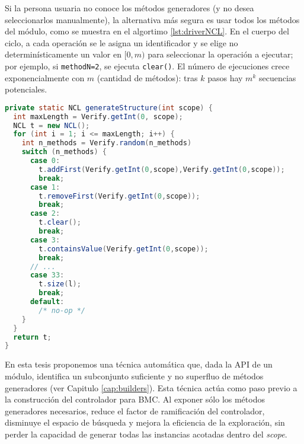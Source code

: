 Si la persona usuaria no conoce los métodos generadores (y no desea seleccionarlos manualmente), la alternativa más segura es
usar todos los métodos del módulo, como se muestra en el algortimo \ref{lst:driverNCL}. En el
cuerpo del ciclo, a cada operación se le asigna un identificador y se elige no determinísticamente un valor en \([0, m)\) para
seleccionar la operación a ejecutar; por ejemplo, si
\texttt{methodN=2}, se ejecuta \texttt{clear()}. El número de ejecuciones crece exponencialmente con \(m\) (cantidad de
métodos): tras \(k\) pasos hay \(m^{k}\) secuencias potenciales.
\\
\begin{lstlisting}[language=Java,caption={Controlador con todos los métodos},label={lst:driverNCL},captionpos=b] 
private static NCL generateStructure(int scope) {
  int maxLength = Verify.getInt(0, scope);
  NCL t = new NCL();
  for (int i = 1; i <= maxLength; i++) {
    int n_methods = Verify.random(n_methods)
    switch (n_methods) {
      case 0:
        t.addFirst(Verify.getInt(0,scope),Verify.getInt(0,scope));
        break;
      case 1:
        t.removeFirst(Verify.getInt(0,scope));
        break;
      case 2:
        t.clear();
        break;
      case 3:
        t.containsValue(Verify.getInt(0,scope));
        break;
      // ...
      case 33:
        t.size(l);
        break;
      default:
        /* no-op */
    }
  }
  return t;
}
\end{lstlisting}


En esta tesis proponemos una técnica automática que, dada la API de un módulo, identifica un subconjunto suficiente y no superfluo de
métodos generadores (ver Capitulo \ref{cap:builders}). Esta técnica actúa como paso previo a la construcción del controlador
para BMC. Al exponer sólo los métodos generadores necesarios, reduce el factor de ramificación del controlador, disminuye el
espacio de búsqueda y mejora la eficiencia de la exploración, sin perder la capacidad de generar todas las instancias acotadas dentro
del \emph{scope}.
